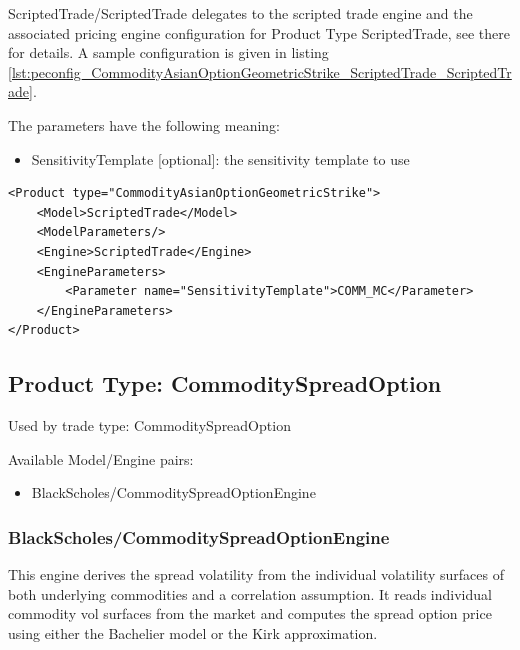 ScriptedTrade/ScriptedTrade delegates to the scripted trade engine and the associated pricing engine configuration for
Product Type ScriptedTrade, see there for details. A sample configuration is given in listing
\ref{lst:peconfig_CommodityAsianOptionGeometricStrike_ScriptedTrade_ScriptedTrade}.

The parameters have the following meaning:

\begin{itemize}
\item SensitivityTemplate [optional]: the sensitivity template to use
\end{itemize}

\begin{longlisting}
\begin{verbatim}
<Product type="CommodityAsianOptionGeometricStrike">
    <Model>ScriptedTrade</Model>
    <ModelParameters/>
    <Engine>ScriptedTrade</Engine>
    <EngineParameters>
        <Parameter name="SensitivityTemplate">COMM_MC</Parameter>
    </EngineParameters>
</Product>
\end{verbatim}
\caption{Configuration for Product CommodityAsianOptionGeometricStrike, Model ScriptedTrade, Engine ScriptedTrade}
\label{lst:peconfig_CommodityAsianOptionGeometricStrike_ScriptedTrade_ScriptedTrade}
\end{longlisting}

\subsection{Product Type: CommoditySpreadOption}

Used by trade type: CommoditySpreadOption

Available Model/Engine pairs:

\begin{itemize}
\item BlackScholes/CommoditySpreadOptionEngine
\end{itemize}

\subsubsection{BlackScholes/CommoditySpreadOptionEngine}

This engine derives the spread volatility from the individual volatility surfaces of both underlying commodities and
a correlation assumption. It reads individual commodity vol surfaces from the market and computes the spread option
price using either the Bachelier model or the Kirk approximation.

